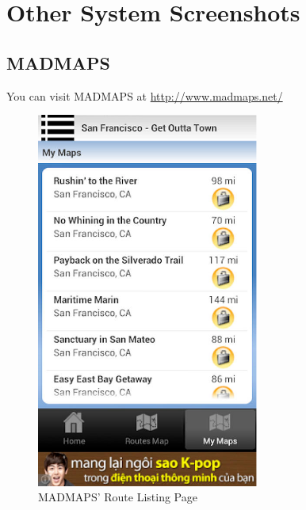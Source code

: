 \documentclass[a4paper,twoside,notitlepage,11pt]{article}
\begin{document}



\newpage 
\appendix
\section{Other System Screenshots} \label{app-othersystems}
\subsection{MADMAPS} 
You can visit MADMAPS at \url{http://www.madmaps.net/}
\begin{figure}[!ht]
	\centering
	\begin{minipage}{.49\textwidth}
		\begin{center}
			\includegraphics[width=0.65\textwidth]{images/mm-1.png}
			\caption{MADMAPS' Route Listing Page}
		\end{center}
	\end{minipage}
	\begin{minipage}{.49\textwidth}
		\begin{center}

\end{center}
\end{minipage}
\end{figure}
\end{document}

